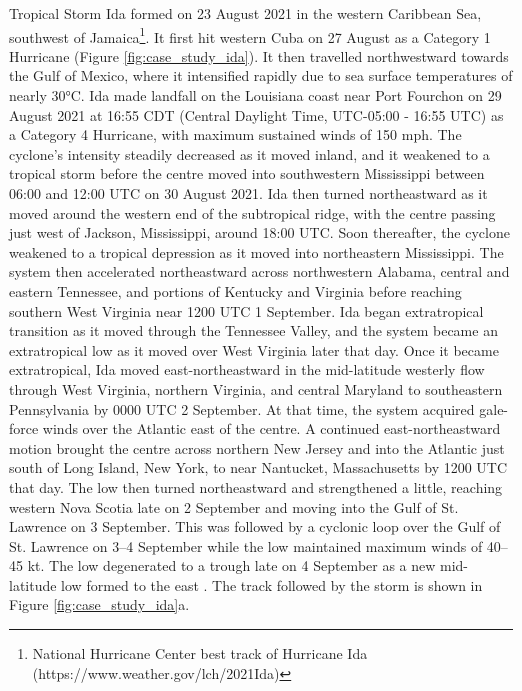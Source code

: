 Tropical  Storm Ida formed on 23 August 2021 in the western Caribbean Sea, southwest of Jamaica\footnote{National Hurricane Center best track of Hurricane Ida (https://www.weather.gov/lch/2021Ida)}. It first hit western Cuba on 27 August as a Category 1 Hurricane (Figure \ref{fig:case_study_ida}). It then travelled northwestward towards the Gulf of Mexico, where it intensified rapidly due to sea surface temperatures of nearly 30°C. Ida made landfall on the Louisiana coast near Port Fourchon on 29 August 2021 at 16:55 CDT (Central Daylight Time, UTC-05:00 - 16:55 UTC) as a Category 4 Hurricane, with maximum sustained winds of 150 mph. The cyclone’s intensity steadily decreased as it moved inland, and it weakened to a tropical storm before the centre moved into southwestern Mississippi between 06:00 and 12:00 UTC on 30 August 2021. Ida then turned northeastward as it moved around the western end of the subtropical ridge, with the centre passing just west of Jackson, Mississippi, around 18:00 UTC. Soon thereafter, the cyclone weakened to a tropical depression as it moved into northeastern Mississippi. The system then accelerated northeastward across northwestern Alabama, central and eastern Tennessee, and portions of Kentucky and Virginia before reaching southern West Virginia near 1200 UTC 1 September. Ida began extratropical transition as it moved through the Tennessee Valley, and the system became an extratropical low as it moved over West Virginia later that day. Once it became extratropical, Ida moved east-northeastward in the mid-latitude westerly flow through West Virginia, northern Virginia, and central Maryland to southeastern Pennsylvania by 0000 UTC 2 September. At that time, the system acquired gale-force winds over the Atlantic east of the centre. A continued east-northeastward motion brought the centre across northern New Jersey and into the Atlantic just south of Long Island, New York, to near Nantucket, Massachusetts by 1200 UTC that day. The low then turned northeastward and strengthened a little, reaching western Nova Scotia late on 2 September and moving into the Gulf of St. Lawrence on 3 September. This was followed by a cyclonic loop over the Gulf of St. Lawrence on 3–4 September while the low maintained maximum winds of 40–45 kt. The low degenerated to a trough late on 4 September as a new mid-latitude low formed to the east \citep{Beven_2022}. The track followed by the storm is shown in Figure \ref{fig:case_study_ida}a.


